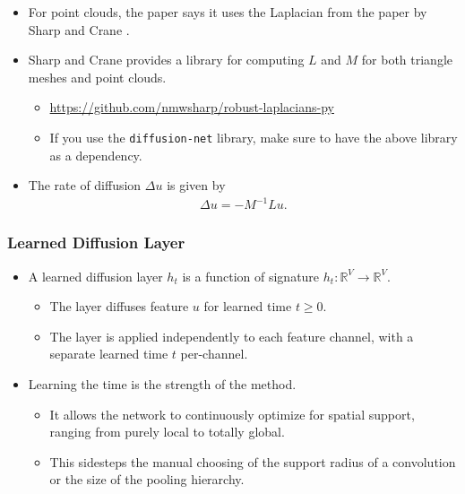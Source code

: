\documentclass[10pt]{article}
\newcommand{\ra}{\rightarrow}
\newcommand{\Real}{\mathbb{R}}
\begin{document}
\begin{itemize}
    \item For point clouds, the paper says it uses the Laplacian from the paper by Sharp and Crane \cite{Sharp:2020:LNT}.
    
    \item Sharp and Crane provides a library for computing $L$ and $M$ for both triangle meshes and point clouds.
    \begin{itemize}
        \item \url{https://github.com/nmwsharp/robust-laplacians-py}
        \item If you use the {\tt diffusion-net} library, make sure to have the above library as a dependency.
    \end{itemize}
    
    \item The rate of diffusion $\Delta u$ is given by
    \begin{align*}
        \Delta u = -M^{-1}L u.
    \end{align*}
\end{itemize}

\subsubsection{Learned Diffusion Layer}

\begin{itemize}
    \item A learned diffusion layer $h_t$ is a function of signature $h_t: \Real^V \ra \Real^V$.
    \begin{itemize}
        \item The layer diffuses feature $u$ for learned time $t \geq 0$.
        \item The layer is applied independently to each feature channel, with a separate learned time $t$ per-channel.        
    \end{itemize}

    \item Learning the time is the strength of the method.
    \begin{itemize}
        \item It allows the network to continuously optimize for spatial support, ranging from purely local to totally global.
        
        \item This sidesteps the manual choosing of the support radius of a convolution or the size of the pooling hierarchy.
    \end{itemize}
\end{itemize}
\end{document}
